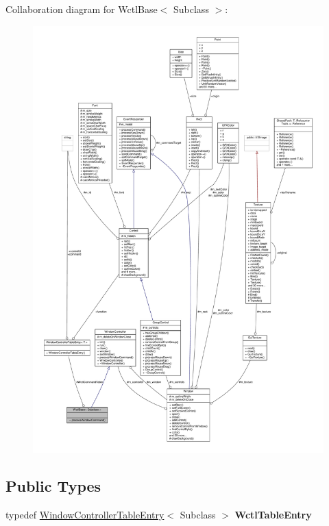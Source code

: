 Collaboration diagram for Wctl\+Base$<$ Subclass $>$\+:
\nopagebreak
\begin{figure}[H]
\begin{center}
\leavevmode
\includegraphics[width=350pt]{d3/d45/classWctlBase__coll__graph}
\end{center}
\end{figure}
\subsection*{Public Types}
\begin{DoxyCompactItemize}
\item 
typedef \hyperlink{structWindowControllerTableEntry}{Window\+Controller\+Table\+Entry}$<$ Subclass $>$ {\bfseries Wctl\+Table\+Entry}\hypertarget{classWctlBase_af4cde761679d050a51869d8e428f5360}{}\label{classWctlBase_af4cde761679d050a51869d8e428f5360}

\end{DoxyCompactItemize}
